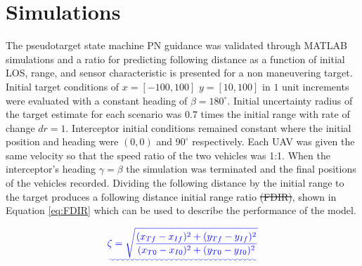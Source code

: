 \documentclass[conference]{IEEEtran}
\providecommand{\DIFadd}[1]{{\protect\color{blue}\uwave{#1}}} %
\providecommand{\DIFdel}[1]{{\protect\color{red}\sout{#1}}}                      %
\providecommand{\DIFaddbegin}{} %
\providecommand{\DIFaddend}{} %
\providecommand{\DIFdelbegin}{} %
\providecommand{\DIFdelend}{} %
\newcommand{\DIFscaledelfig}{0.5}
\newlength{\DIFdelgraphicswidth} %
\newlength{\DIFdelgraphicsheight} %
\newcommand{\DIFaddincludegraphics}[2][]{{\color{blue}\fbox{\DIFOincludegraphics[#1]{#2}}}} %
\newcommand{\DIFdelincludegraphics}[2][]{%
\sbox{\DIFdelgraphicsbox}{\DIFOincludegraphics[#1]{#2}}%
\settoboxwidth{\DIFdelgraphicswidth}{\DIFdelgraphicsbox} %
\settoboxtotalheight{\DIFdelgraphicsheight}{\DIFdelgraphicsbox} %
\scalebox{\DIFscaledelfig}{%
\parbox[b]{\DIFdelgraphicswidth}{\usebox{\DIFdelgraphicsbox}\\[-\baselineskip] \rule{\DIFdelgraphicswidth}{0em}}\llap{\resizebox{\DIFdelgraphicswidth}{\DIFdelgraphicsheight}{%
\setlength{\unitlength}{\DIFdelgraphicswidth}%
\begin{picture}(1,1)%
\thicklines\linethickness{2pt} %
{\color[rgb]{1,0,0}\put(0,0){\framebox(1,1){}}}%
{\color[rgb]{1,0,0}\put(0,0){\line( 1,1){1}}}%
{\color[rgb]{1,0,0}\put(0,1){\line(1,-1){1}}}%
\end{picture}%
}\hspace*{3pt}}} %
} %
\DeclareRobustCommand{\DIFaddbegin}{\DIFOaddbegin \let\includegraphics\DIFaddincludegraphics} %
\DeclareRobustCommand{\DIFaddend}{\DIFOaddend \let\includegraphics\DIFOincludegraphics} %
\DeclareRobustCommand{\DIFdelbegin}{\DIFOdelbegin \let\includegraphics\DIFdelincludegraphics} %
\DeclareRobustCommand{\DIFdelend}{\DIFOaddend \let\includegraphics\DIFOincludegraphics} %
\begin{document}
\section{Simulations}
The pseudotarget state machine PN guidance was validated through MATLAB simulations and a ratio for predicting following distance as a function of initial LOS, range, and sensor characteristic is presented for a non maneuvering target. Initial target conditions of $x = [-100,100]$ $y = [10,100]$ in $1$ unit increments were evaluated with a constant heading of $\beta = 180^{\circ}$. Initial uncertainty radius of the target estimate for each scenario was $0.7$ times the initial range with rate of change $dr = 1$. Interceptor initial conditions remained constant where the initial position and heading were $(0,0)$ and $90^{\circ}$ respectively. Each UAV was given the same velocity so that the speed ratio of the two vehicles was 1:1. When the interceptor's heading $\gamma = \beta$ the simulation was terminated and the final positions of the vehicles recorded. Dividing the following distance by the initial range to the target produces a following distance initial range ratio \DIFdelbegin \DIFdel{(FDIR)}\DIFdelend \DIFaddbegin \DIFadd{$\zeta$}\DIFaddend , shown in Equation \ref{eq:FDIR} which can be used to describe the performance of the model.


\DIFaddbegin \begin{equation} 
\DIFadd{\label{eq:FDIR}
\zeta = \sqrt{\frac{(x_{Tf}-x_{If})^2+(y_{Tf}-y_{If})^2}{(x_{T0}-x_{I0})^2+(y_{T0}-y_{I0})^2}}
}\end{equation}
\DIFaddend 

\DIFdelbegin %
\end{document}
